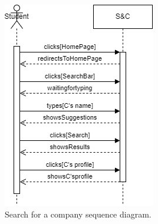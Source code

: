 \begin{figure}[H]
    \begin{center}
        \includegraphics[width=1\linewidth]{Images/image5.png}
        \caption{Search for a company sequence diagram.}
        \label{fig:search_for_a_company_seqdiag}%
    \end{center}
\end{figure}


